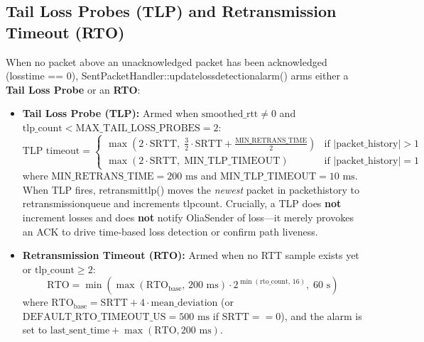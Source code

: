 \documentclass[10pt,a4paper]{article}
\newcommand{\codeul}{\textunderscore\hspace{0pt}}
\DeclareRobustCommand{\code}[1]{{\ttfamily\let\_\codeul #1}}
\begin{document}
\subsection{Tail Loss Probes (TLP) and Retransmission Timeout (RTO)}
When no packet above an unacknowledged packet has been acknowledged (\code{loss\_time == 0}), \code{SentPacketHandler::\hspace{0pt}update\_loss\_detection\_alarm()} arms either a \textbf{Tail Loss Probe} or an \textbf{RTO}:
\begin{itemize}
    \item \textbf{Tail Loss Probe (TLP):} Armed when $\text{smoothed\_rtt} \neq 0$ and $\text{tlp\_count} < \text{MAX\_TAIL\_LOSS\_PROBES} = 2$:
    \begin{equation}
        \text{TLP timeout} =
        \begin{cases}
            \max\!\left(2 \cdot \text{SRTT},\; \frac{3}{2}\cdot\text{SRTT} + \frac{\text{MIN\_RETRANS\_TIME}}{2}\right) & \text{if } |\text{packet\_history}| > 1 \\
            \max\!\left(2 \cdot \text{SRTT},\; \text{MIN\_TLP\_TIMEOUT}\right) & \text{if } |\text{packet\_history}| = 1
        \end{cases}
    \end{equation}
    where $\text{MIN\_RETRANS\_TIME} = 200\text{ ms}$ and $\text{MIN\_TLP\_TIMEOUT} = 10\text{ ms}$. When TLP fires, \code{retransmit\_tlp()} moves the \emph{newest} packet in \code{packet\_history} to \code{retransmission\_queue} and increments \code{tlp\_count}. Crucially, a TLP does \textbf{not} increment \code{losses} and does \textbf{not} notify \code{OliaSender} of loss—it merely provokes an ACK to drive time-based loss detection or confirm path liveness.
    \item \textbf{Retransmission Timeout (RTO):} Armed when no RTT sample exists yet or $\text{tlp\_count} \ge 2$:
    \begin{equation}
        \text{RTO} = \min\!\left(\max\!\left(\text{RTO}_{\text{base}},\, 200\text{ ms}\right) \cdot 2^{\min(\text{rto\_count},\, 16)},\; 60\text{ s}\right)
    \end{equation}
    where $\text{RTO}_{\text{base}} = \text{SRTT} + 4 \cdot \text{mean\_deviation}$ (or $\text{DEFAULT\_RTO\_TIMEOUT\_US} = 500\text{ ms}$ if $\text{SRTT} == 0$), and the alarm is set to $\text{last\_sent\_time} + \max(\text{RTO}, 200\text{ ms})$.
\end{itemize}
\end{document}
